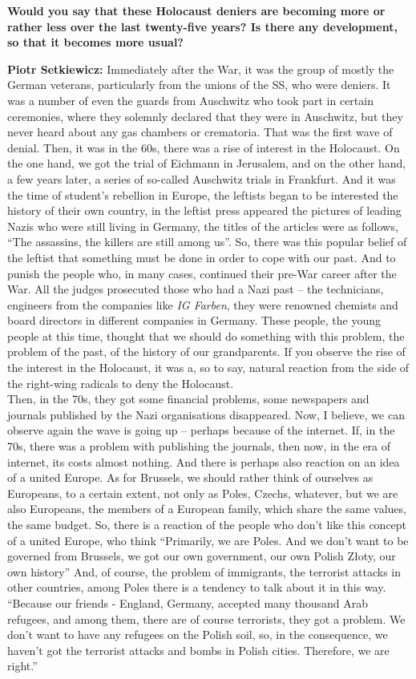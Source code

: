 \textbf{Would you say that these Holocaust deniers are becoming more or rather less over the last twenty-five years? Is there any development, so that it becomes more usual?}

\textbf{Piotr Setkiewicz:} Immediately after the War, it was the group of mostly the German veterans, particularly from the unions of the SS, who were deniers. It was a number of even the guards from Auschwitz who took part in certain ceremonies, where they solemnly declared that they were in Auschwitz, but they never heard about any gas chambers or crematoria. That was the first wave of denial. Then, it was in the 60s, there was a rise of interest in the Holocaust. On the one hand, we got the trial of Eichmann in Jerusalem, and on the other hand, a few years later, a series of so-called Auschwitz trials in Frankfurt. And it was the time of student’s rebellion in Europe, the leftists began to be interested the history of their own country, in the leftist press appeared the pictures of leading Nazis who were still living in Germany, the titles of the articles were as follows, ``The assassins, the killers are still among us''. So, there was this popular belief of the leftist that something must be done in order to cope with our past. And to punish the people who, in many cases, continued their pre-War career after the War. All the judges prosecuted those who had a Nazi past – the technicians, engineers from the companies like \textit{IG Farben}, they were renowned chemists and board directors in different companies in Germany. These people, the young people at this time, thought that we should do something with this problem, the problem of the past, of the history of our grandparents. If you observe the rise of the interest in the Holocaust, it was a, so to say, natural reaction from the side of the right-wing radicals to deny the Holocaust.\\
Then, in the 70s, they got some financial problems, some newspapers and journals published by the Nazi organisations disappeared. Now, I believe, we can observe again the wave is going up – perhaps because of the internet. If, in the 70s, there was a problem with publishing the journals, then now, in the era of internet, its costs almost nothing. 
And there is perhaps also reaction on an idea of a united Europe. As for Brussels, we should rather think of ourselves as Europeans, to a certain extent, not only as Poles, Czechs, whatever, but we are also Europeans, the members of a European family, which share the same values, the same budget. So, there is a reaction of the people who don’t like this concept of a united Europe, who think ``Primarily, we are Poles. And we don’t want to be governed from Brussels, we got our own government, our own Polish Złoty, our own history'' And, of course, the problem of immigrants, the terrorist attacks in other countries, among Poles there is a tendency to talk about it in this way. ``Because our friends - England, Germany, accepted many thousand Arab refugees, and among them, there are of course terrorists, they got a problem. We don’t want to have any refugees on the Polish soil, so, in the consequence, we haven’t got the terrorist attacks and bombs in Polish cities. Therefore, we are right.''

